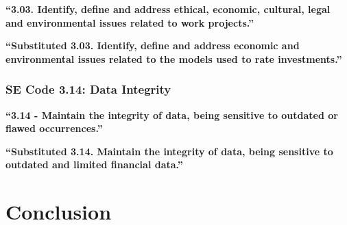 \documentclass[11pt]{article}
\begin{document}
\begin{multicols}{2}
   \textbf{``3.03. Identify, define and address ethical, economic, cultural, legal and environmental issues related to work projects.''}


   \textbf{``Substituted 3.03. Identify, define and address economic and environmental issues related to the models used to rate investments.''}


\subsubsection{SE Code 3.14: Data Integrity}


   \textbf{``3.14 - Maintain the integrity of data, being sensitive to outdated or flawed occurrences.''}


   \textbf{``Substituted 3.14. Maintain the integrity of data, being sensitive to outdated and limited financial data.''}


\section{Conclusion}

\end{multicols}
\newpage


\nocite{*}




\end{document}
